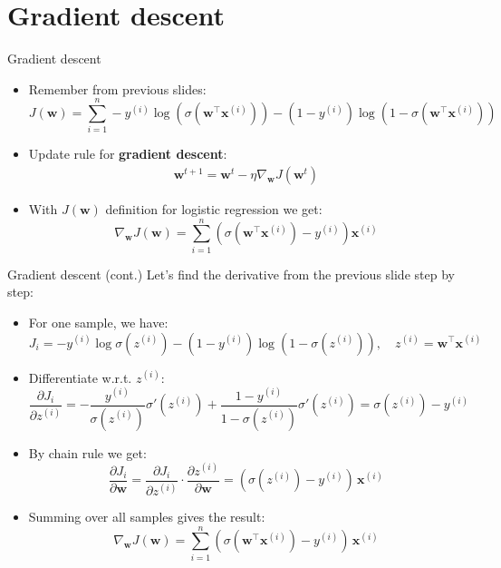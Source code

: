 \documentclass[serif, aspectratio=169]{beamer}
\begin{document}
\section{Gradient descent}
\begin{frame}{Gradient descent}
    \begin{itemize}
    \item Remember from previous slides:
        \[
        J(\mathbf{w}) = \sum_{i=1}^{n}-y^{(i)}\log (\sigma (\mathbf{w}^\top  \mathbf{x}^{(i)})) - 
            (1-y^{(i)})\log (1 - \sigma (\mathbf{w}^\top  \mathbf{x}^{(i)}))
        \]
    \item Update rule for \textbf{gradient descent}: 
        \begin{align*}
            \mathbf{w}^{t+1} = \mathbf{w}^t - \eta \nabla_{\mathbf{w}} J(\mathbf{w}^t)
        \end{align*}
    \item With $J(\mathbf{w})$ definition for logistic regression we get:
    \[
    \nabla_\mathbf{w} J(\mathbf{w})
    = \sum_{i=1}^{n} (\sigma(\mathbf{w}^\top \mathbf{x}^{(i)}) - y^{(i)})\mathbf{x}^{(i)}
    \]
        
    \end{itemize}
\end{frame}

\begin{frame}{Gradient descent (cont.)}
Let's find the derivative from the previous slide step by step:
    \begin{itemize}
        \item For one sample, we have:
        \[
        J_i = -y^{(i)}\log\sigma(z^{(i)}) - (1 - y^{(i)})\log(1 - \sigma(z^{(i)})), 
        \quad z^{(i)} = \mathbf{w}^\top \mathbf{x}^{(i)}
        \]
        \item Differentiate w.r.t. \(z^{(i)}\):
        \[
        \frac{\partial J_i}{\partial z^{(i)}} 
        = -\frac{y^{(i)}}{\sigma(z^{(i)})}\sigma'(z^{(i)}) 
        + \frac{1 - y^{(i)}}{1 - \sigma(z^{(i)})}\sigma'(z^{(i)})
        = \sigma(z^{(i)}) - y^{(i)}
        \]
        \item By chain rule we get:
        \[
        \frac{\partial J_i}{\partial \mathbf{w}} = 
        \frac{\partial J_i}{\partial z^{(i)}} \cdot \frac{\partial z^{(i)}}{\partial \mathbf{w}} = (\sigma(z^{(i)}) - y^{(i)})\,\mathbf{x}^{(i)}
        \]
        \item Summing over all samples gives the result:
        \[
        \nabla_{\mathbf{w}} J(\mathbf{w}) 
        = \sum_{i=1}^{n} (\sigma(\mathbf{w}^\top \mathbf{x}^{(i)}) - y^{(i)})\,\mathbf{x}^{(i)}
        \]
    \end{itemize}
\end{frame}
\end{document}
